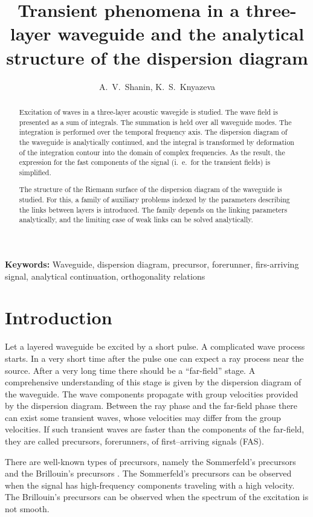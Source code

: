 \documentclass[12pt]{article}
\title{Transient phenomena in a three-layer waveguide and the analytical 
structure of the dispersion diagram}
\author{A.~V.~Shanin, K.~S.~Knyazeva}
\begin{document}
\maketitle

\begin{abstract}
Excitation of waves in a three-layer acoustic wavegide is studied.
The wave field is presented as a sum of integrals. The summation is held over all 
waveguide modes. The integration is performed over the temporal frequency axis. 
The dispersion diagram of the waveguide is analytically continued,  
and the integral 
is transformed by deformation of the integration contour into the domain of complex frequencies.   
As the result, the expression for the fast components of the signal (i.~e.\ for the transient 
fields) is simplified. 

The structure of the Riemann surface of the dispersion diagram of the waveguide is studied.
For this, a family of auxiliary problems indexed by the parameters describing the 
links between layers is introduced. The family depends on the linking parameters analytically, 
and the limiting case of weak links can be solved analytically.
\end{abstract}

{\bf Keywords:} Waveguide, dispersion diagram, precursor, forerunner, firs-arriving signal, 
analytical continuation, orthogonality relations


\section{Introduction}

Let a layered waveguide be excited by a short pulse. A complicated wave process 
starts. In a very short time after the pulse one can expect a ray process 
near the source. After a very long time there should be a ``far-field'' stage. A comprehensive understanding of this stage is given by the dispersion diagram of the waveguide.
The wave components propagate with group velocities provided by the 
dispersion diagram. Between the ray phase and the far-field phase there can exist 
some transient waves, whose velocities may differ from the group velocities. If such 
transient waves are faster than the components of the far-field, they are called precursors, forerunners, 
of first--arriving signals (FAS). 

There are well-known types of precursors, namely the Sommerfeld's precursors and the Brillouin's precursors \cite{Brillouin,Akhmanov}. The Sommerfeld's precursors can be observed when the signal has high-frequency components traveling with a high velocity. The 
Brillouin's precursors can be observed when the spectrum of the excitation is not smooth.   
\end{document}

